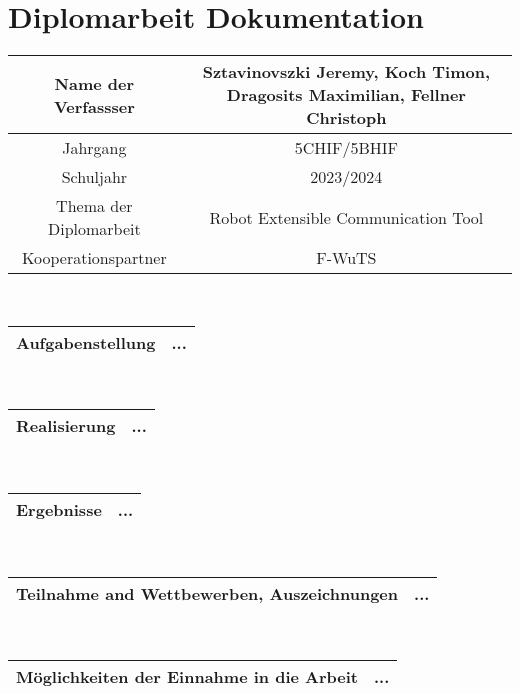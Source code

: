\chapter{Diplomarbeit Dokumentation}

\begin{center}
\begin{tabular}{| c | c |}
    \hline
    Name der Verfassser & Sztavinovszki Jeremy, Koch Timon, Dragosits Maximilian, Fellner Christoph\\
    \hline
    Jahrgang & 5CHIF/5BHIF\\
    Schuljahr & 2023/2024\\
    \hline
    Thema der Diplomarbeit & Robot Extensible Communication Tool\\
    \hline
    Kooperationspartner & F-WuTS\\
\end{tabular}

\\

\begin{tabular}{| c | c |}
    \hline
    Aufgabenstellung & ...\\ %
    \hline
\end{tabular}

\\

\begin{tabular}{| c | c |}
    \hline
    Realisierung & ...\\ %
    \hline
\end{tabular}

\\

\begin{tabular}{| c | c |}
    \hline
    Ergebnisse & ...\\ %
    \hline
\end{tabular}

\\

\begin{tabular}{| c | c |}
    \hline
    Teilnahme and Wettbewerben, Auszeichnungen & ...\\ %
    \hline
\end{tabular}

\\

\begin{tabular}{| c | c |}
    \hline
    Möglichkeiten der Einnahme in die Arbeit & ...\\ %
    \hline
\end{tabular}


\end{center}
